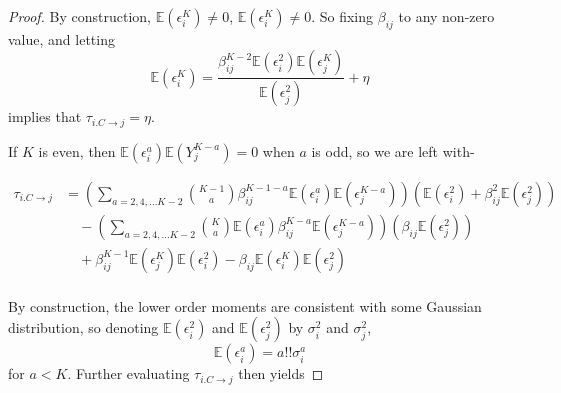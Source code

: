 \documentclass[]{article}
\newcommand{\E}{\mathbb{E}}
\begin{document}
\begin{proof}
By construction, $\E(\epsilon_i^K) \neq 0$, $\E(\epsilon_i^K) \neq 0$. So fixing $\beta_{ij}$ to any non-zero value, and letting
\[\E(\epsilon_i^K) = \frac{\beta_{ij}^{K-2}\E(\epsilon_i^2)\E(\epsilon_j^K)}{\E(\epsilon_j^2)}  + \eta\]
implies that $\tau_{i.C\rightarrow j} = \eta$.

If $K$ is even, then $\E(\epsilon_i^a)\E(Y_j^{K-a}) = 0$ when $a$ is odd, so we are left with-

\begin{equation}
\begin{aligned}
\tau_{i.C\rightarrow j} &= \left(\sum_{a = 2,4,\ldots K-2}{K-1 \choose a} \beta_{ij}^{K-1 - a}\E\left(\epsilon_i^a\right) \E\left(\epsilon_j^{K-a}\right)\right) \left(\E(\epsilon_i^2)  + \beta_{ij}^2\E(\epsilon_j^2) \right)
\\
&\quad - \left(\sum_{a = 2,4,\ldots K-2} {K \choose a} \E\left(\epsilon_i^a \right) \beta_{ij}^{K - a}\E\left(\epsilon_j^{K - a}\right)\right)
\left(\beta_{ij}\E\left(\epsilon_j^2\right) \right)\\
& \quad + \beta_{ij}^{K-1}\E(\epsilon_j^K)\E(\epsilon_i^2) - \beta_{ij}\E(\epsilon_i^K)\E(\epsilon_j^2)\\
\end{aligned}
\end{equation}

By construction, the lower order moments are consistent with some Gaussian distribution, so denoting $\E(\epsilon_i^2)$ and $\E(\epsilon_j^2)$ by $\sigma_i^2$ and $\sigma_j^2$,
\[\E(\epsilon_i^a) = a!!\sigma_i^a \]
for $a < K$. Further evaluating $\tau_{i.C \rightarrow j}$ then yields


\end{proof}
\end{document}
